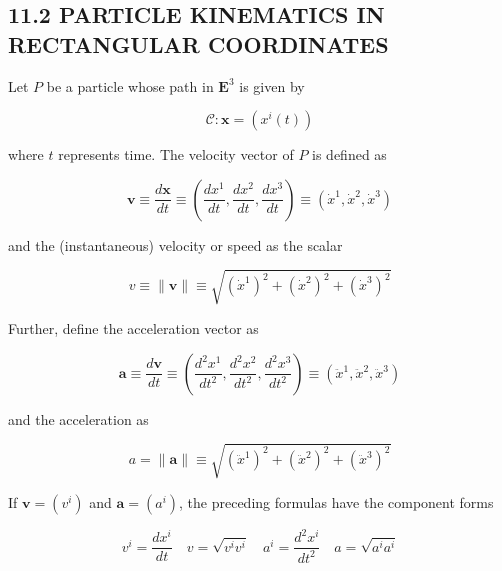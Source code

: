 \documentclass[10pt]{article}
\begin{document}
\subsection*{11.2 PARTICLE KINEMATICS IN RECTANGULAR COORDINATES}
Let $P$ be a particle whose path in $\mathbf{E}^{3}$ is given by


\begin{equation*}
\mathscr{C}: \mathbf{x}=\left(x^{i}(t)\right) \tag{11.1}
\end{equation*}


where $t$ represents time. The velocity vector of $P$ is defined as


\begin{equation*}
\mathbf{v} \equiv \frac{d \mathbf{x}}{d t} \equiv\left(\frac{d x^{1}}{d t}, \frac{d x^{2}}{d t}, \frac{d x^{3}}{d t}\right) \equiv\left(\dot{x}^{1}, \dot{x}^{2}, \dot{x}^{3}\right) \tag{11.2}
\end{equation*}


and the (instantaneous) velocity or speed as the scalar


\begin{equation*}
v \equiv\|\mathbf{v}\| \equiv \sqrt{\left(\dot{x}^{1}\right)^{2}+\left(\dot{x}^{2}\right)^{2}+\left(\dot{x}^{3}\right)^{2}} \tag{11.3}
\end{equation*}


Further, define the acceleration vector as


\begin{equation*}
\mathbf{a} \equiv \frac{d \mathbf{v}}{d t} \equiv\left(\frac{d^{2} x^{1}}{d t^{2}}, \frac{d^{2} x^{2}}{d t^{2}}, \frac{d^{2} x^{3}}{d t^{2}}\right) \equiv\left(\ddot{x}^{1}, \ddot{x}^{2}, \ddot{x}^{3}\right) \tag{11.4}
\end{equation*}


and the acceleration as


\begin{equation*}
a=\|\mathbf{a}\| \equiv \sqrt{\left(\ddot{x}^{1}\right)^{2}+\left(\ddot{x}^{2}\right)^{2}+\left(\ddot{x}^{3}\right)^{2}} \tag{11.5}
\end{equation*}


If $\mathbf{v}=\left(v^{i}\right)$ and $\mathbf{a}=\left(a^{i}\right)$, the preceding formulas have the component forms


\begin{equation*}
v^{i}=\frac{d x^{i}}{d t} \quad v=\sqrt{v^{i} v^{i}} \quad a^{i}=\frac{d^{2} x^{i}}{d t^{2}} \quad a=\sqrt{a^{i} a^{i}} \tag{11.6}
\end{equation*}
\end{document}

